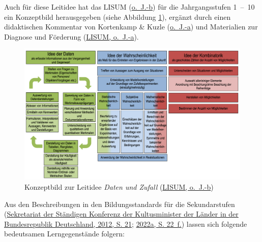 \documentclass[
]{scrbook}
\theoremstyle{definition}
\theoremstyle{definition}
\theoremstyle{definition}
\theoremstyle{definition}
\theoremstyle{remark}
\begin{document}
Auch für diese Leitidee hat das LISUM (\protect\hyperlink{ref-LISUMa}{o.~J.-b}) für die Jahrgangsstufen 1~--~10 ein Konzeptbild herausgegeben (siehe Abbildung \ref{fig:KonzeptDatenZufall}), ergänzt durch einen didaktischen Kommentar von Kortenkamp \& Kuzle (\protect\hyperlink{ref-Kortenkamp}{o.~J.-a}) und Materialien zur Diagnose und Förderung (\protect\hyperlink{ref-LISUM}{LISUM, o.~J.-a}).



\begin{figure}

{\centering \includegraphics[width=0.9\linewidth]{pictures/14-KonzeptDatenZufall} 

}

\caption{Konzeptbild zur Leitidee \emph{Daten und Zufall} (\protect\hyperlink{ref-LISUMa}{LISUM, o.~J.-b})}\label{fig:KonzeptDatenZufall}
\end{figure}

Aus den Beschreibungen in den Bildungsstandards für die Sekundarstufen (\protect\hyperlink{ref-KMK:2012}{Sekretariat der Ständigen Konferenz der Kultusminister der Länder in der Bundesrepublik Deutschland, 2012, S. 21}; \protect\hyperlink{ref-SekretariatderStandigenKonferenzderKultusministerderLanderinderBundesrepublikDeutschland2022}{2022a, S. 22~f.}) lassen sich folgende bedeutsamen Lerngegenstände folgern:
\end{document}
